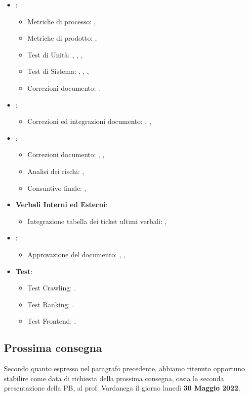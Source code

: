 \begin{itemize} 
\item \textbf{\PdQ}:
\begin{itemize}
\item Metriche di processo: \FP{},
\item Metriche di prodotto: \LW{},
\item Test di Unità: \FP{}, \GC{}, \MG{},
\item Test di Sistema: \FP{}, \GC{}, \MG{},
\item Correzioni documento: \FP{}.
\end{itemize}
\item \textbf{\NdP}:
\begin{itemize}
\item Correzioni ed integrazioni documento: \MG{}, \PV{},
\end{itemize}
\item \textbf{\PdP}:
\begin{itemize}
\item Correzioni documento: \MB{}, \EP{},
\item Analisi dei rischi: \MB{},
\item Consuntivo finale: \EP{},
\end{itemize}
\item \textbf{Verbali Interni ed Esterni}:
\begin{itemize}
\item Integrazione tabella dei ticket ultimi verbali: \PV{},
\end{itemize}
\item \textbf{\MU}:
\begin{itemize}
\item Approvazione del documento: \FP{}, \MG{},
\end{itemize}
\item \textbf{Test}:
\begin{itemize}
\item Test Crawling: \FP{}.
\item Test Ranking: \MG{}.
\item Test Frontend: \GC{}.
\end{itemize}
\end{itemize}

\subsection{Prossima consegna}

Secondo quanto espresso nel paragrafo precedente, abbiamo ritenuto opportuno stabilire come data di richiesta della prossima consegna, ossia la seconda presentazione della PB, al prof. Vardanega il giorno lunedì \textbf{30 Maggio 2022}. 


